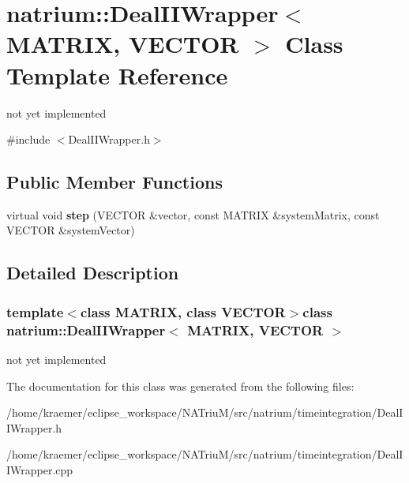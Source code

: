 \hypertarget{classnatrium_1_1DealIIWrapper}{\section{natrium\-:\-:Deal\-I\-I\-Wrapper$<$ M\-A\-T\-R\-I\-X, V\-E\-C\-T\-O\-R $>$ Class Template Reference}
\label{classnatrium_1_1DealIIWrapper}
}


not yet implemented  




{\ttfamily \#include $<$Deal\-I\-I\-Wrapper.\-h$>$}

\subsection*{Public Member Functions}
\begin{DoxyCompactItemize}
\item 
\hypertarget{classnatrium_1_1DealIIWrapper_a879ff25fa485bdffecbdf6083d0c3d45}{virtual void {\bfseries step} (V\-E\-C\-T\-O\-R \&vector, const M\-A\-T\-R\-I\-X \&system\-Matrix, const V\-E\-C\-T\-O\-R \&system\-Vector)}\label{classnatrium_1_1DealIIWrapper_a879ff25fa485bdffecbdf6083d0c3d45}

\end{DoxyCompactItemize}


\subsection{Detailed Description}
\subsubsection*{template$<$class M\-A\-T\-R\-I\-X, class V\-E\-C\-T\-O\-R$>$class natrium\-::\-Deal\-I\-I\-Wrapper$<$ M\-A\-T\-R\-I\-X, V\-E\-C\-T\-O\-R $>$}

not yet implemented 

The documentation for this class was generated from the following files\-:\begin{DoxyCompactItemize}
\item 
/home/kraemer/eclipse\-\_\-workspace/\-N\-A\-Triu\-M/src/natrium/timeintegration/Deal\-I\-I\-Wrapper.\-h\item 
/home/kraemer/eclipse\-\_\-workspace/\-N\-A\-Triu\-M/src/natrium/timeintegration/Deal\-I\-I\-Wrapper.\-cpp\end{DoxyCompactItemize}
